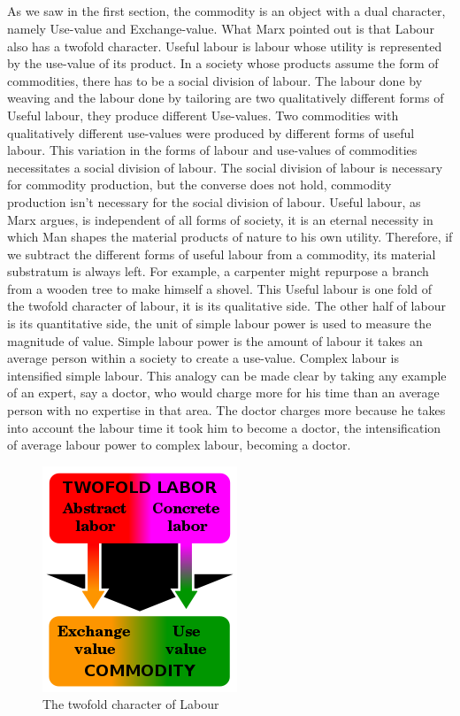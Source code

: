 \documentclass[a4paper,10pt]{article}
\begin{document}
\newpage
\subsection{}

As we saw in the first section, the commodity is an object with a dual character, namely Use-value and Exchange-value. What
Marx pointed out is that Labour also has a twofold character. Useful labour is labour whose utility is represented by the
use-value of its product. In a society whose products assume the form of commodities, there has to be a social division of
labour. The labour done by weaving and the labour done by tailoring are two qualitatively different forms of Useful labour,
they produce different Use-values. Two commodities with qualitatively different use-values were produced by different forms
of useful labour. This variation in the forms of labour and use-values of commodities necessitates a social division of
labour. The social division of labour is necessary for commodity production, but the converse does not hold, commodity
production isn't necessary for the social division of labour. Useful labour, as Marx argues, is independent of all forms of
society, it is an eternal necessity in which Man shapes the material products of nature to his own utility. Therefore, if we
subtract the different forms of useful labour from a commodity, its material substratum is always left. For example, a
carpenter might repurpose a branch from a wooden tree to make himself a shovel. This Useful labour is one fold of the twofold
character of labour, it is its qualitative side. The other half of labour is its quantitative side, the unit of simple labour
power is used to measure the magnitude of value. Simple labour power is the amount of labour it takes an average person
within a society to create a use-value. Complex labour is intensified simple labour. This analogy can be made clear by taking
any example of an expert, say a doctor, who would charge more for his time than an average person with no expertise in that
area. The doctor charges more because he takes into account the labour time it took him to become a doctor, the
intensification of average labour power to complex labour, becoming a doctor.
\begin{figure}[!h]
  \centering
  \includegraphics[width=0.27\linewidth]{./images/twofoldlabour.png}
  \caption{The twofold character of Labour}
  \label{fig 1}
\end{figure}
\end{document}
